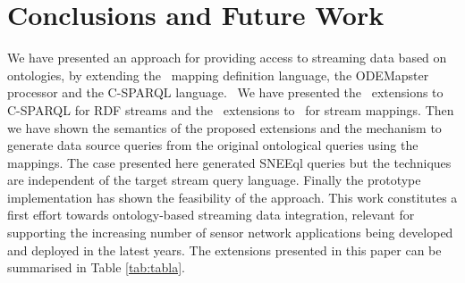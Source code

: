\section{Conclusions and Future Work}
\label{conclusions}

We have presented an approach for providing access to streaming data based on ontologies, by extending the \rtwoo\ mapping definition language, the ODEMapster processor and the C-SPARQL language.\ %
We have presented the \sparqlstr\ extensions to C-SPARQL for RDF streams and the \stwoo\ extensions to \rtwoo\ for
stream mappings. Then we have shown the semantics of the proposed extensions and the mechanism to generate data source
queries from the original ontological queries using the mappings. The case presented here generated SNEEql queries but
the techniques are independent of the target stream query language. Finally the prototype implementation has shown the
feasibility of the approach. This work constitutes a first effort towards ontology-based streaming data integration,
relevant for supporting the increasing number of sensor network applications being developed and deployed in the latest
years. The extensions presented in this paper can be summarised in Table \ref{tab:tabla}.

